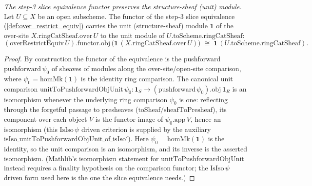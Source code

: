 \begin{definition}
  \label{def:over_restrict_unit_iso}
  \textit{The step-3 slice equivalence functor preserves the structure-sheaf (unit) module.}
  Let \(U \subseteq X\) be an open subscheme. The functor of the step-3 slice
  equivalence (\cref{def:over_restrict_equiv}) carries the unit
  (structure-sheaf) module \(\mathbf{1}\) of the over-site
  \(X.\mathrm{ringCatSheaf}.\mathrm{over}\,U\) to the unit module of
  \(U.\mathrm{toScheme}.\mathrm{ringCatSheaf}\):
  \[
    (\mathrm{overRestrictEquiv}\,U).\mathrm{functor}.\mathrm{obj}\,
      \bigl(\mathbf{1}\,(X.\mathrm{ringCatSheaf}.\mathrm{over}\,U)\bigr)
      \;\cong\; \mathbf{1}\,(U.\mathrm{toScheme}.\mathrm{ringCatSheaf}) .
  \]
\end{definition}
\begin{proof}
  By construction the functor of the equivalence is the pushforward
  \(\mathrm{pushforward}\,\psi_0\) of sheaves of modules along the
  over-site/open-site comparison, where \(\psi_0 = \mathrm{homMk}(\mathbf{1})\)
  is the identity ring comparison. The canonical unit comparison
  \(\mathrm{unitToPushforwardObjUnit}\,\psi_0 : \mathbf{1}_S \to
  (\mathrm{pushforward}\,\psi_0).\mathrm{obj}\,\mathbf{1}_R\) is an isomorphism
  whenever the underlying ring comparison \(\psi_0\) is one: reflecting through the
  forgetful passage to presheaves (\(\mathrm{toSheaf}/\mathrm{sheafToPresheaf}\)),
  its component over each object \(V\) is the functor-image of
  \(\psi_0.\mathrm{app}\,V\), hence an isomorphism (this \(\mathrm{IsIso}\,\psi\)
  driven criterion is supplied by the auxiliary
  \(\mathrm{isIso\_unitToPushforwardObjUnit\_of\_isIso}'\)). Here
  \(\psi_0 = \mathrm{homMk}(\mathbf{1})\) is the identity, so the unit comparison
  is an isomorphism, and its inverse is the asserted isomorphism. (Mathlib's
  isomorphism statement for \(\mathrm{unitToPushforwardObjUnit}\) instead requires
  a finality hypothesis on the comparison functor; the \(\mathrm{IsIso}\,\psi\)
  driven form used here is the one the slice equivalence needs.)
\end{proof}

